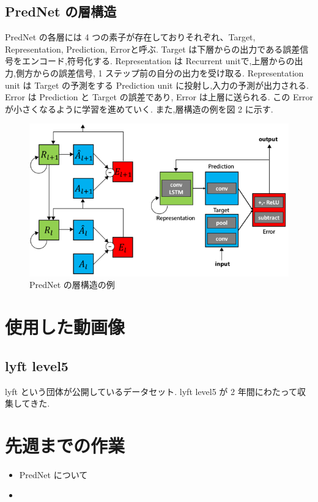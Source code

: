 \subsection{PredNet の層構造}
PredNet の各層には 4 つの素子が存在しておりそれぞれ、Target, Representation, Prediction, Errorと呼ぶ.
Target は下層からの出力である誤差信号をエンコード,符号化する.
Representation は Recurrent unitで,上層からの出力,側方からの誤差信号, 1 ステップ前の自分の出力を受け取る.
Representation unit は Target の予測をする Prediction unit に投射し,入力の予測が出力される.
Error は Prediction と Target の誤差であり, Error は上層に送られる.
この Error が小さくなるように学習を進めていく.
また,層構造の例を図 2 に示す.

 \begin{figure}[hb]
\includegraphics[scale=0.4]{prednet.png}
 \caption{PredNet の層構造の例}
\end{figure}

\section{使用した動画像}
\subsection{lyft level5}
lyft という団体が公開しているデータセット. lyft level5 が 2 年間にわたって収集してきた.

\section{先週までの作業}
\begin{itemize}
          \item PredNet について
          \item 
\end{itemize}

